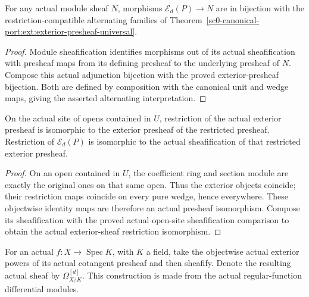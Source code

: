 \begin{theorem}
\label{sc0-canonical-port:ext:exterior-sheaf-universal}
\leanok
For any actual module sheaf \(N\), morphisms
\(\mathcal E_d(P)\to N\) are in bijection with the
restriction-compatible alternating families of
Theorem~\ref{sc0-canonical-port:ext:exterior-presheaf-universal}.
\end{theorem}
\begin{proof}
Module sheafification identifies morphisms out of its
actual sheafification with presheaf maps from its defining
presheaf to the underlying presheaf of \(N\).
Compose this actual adjunction bijection with the
proved exterior-presheaf bijection. Both are defined
by composition with the canonical unit and wedge
maps, giving the asserted alternating interpretation.
\end{proof}

\begin{theorem}
\label{sc0-canonical-port:ext:exterior-open-restriction}
\leanok
On the actual site of opens contained in \(U\),
restriction of the actual exterior presheaf is
isomorphic to the exterior presheaf of the restricted
presheaf. Restriction of \(\mathcal E_d(P)\) is
isomorphic to the actual sheafification of that
restricted exterior presheaf.
\end{theorem}
\begin{proof}
On an open contained in \(U\), the coefficient ring
and section module are exactly the original ones
on that same open. Thus the exterior objects coincide;
their restriction maps coincide on every pure wedge,
hence everywhere. These objectwise identity maps
are therefore an actual presheaf isomorphism.
Compose its sheafification with the proved actual
open-site sheafification comparison to obtain the
actual exterior-sheaf restriction isomorphism.
\end{proof}

\begin{definition}
\label{sc0-canonical-port:ext:relative-exterior-cotangent-sheaf}
\leanok
For an actual \(f:X\to\operatorname{Spec}K\), with
\(K\) a field, take the objectwise actual exterior
powers of its actual cotangent presheaf and then
sheafify. Denote the resulting actual sheaf by
\(\Omega_{X/K}^{[d]}\). This construction is made
from the actual regular-function differential modules.
\end{definition}

